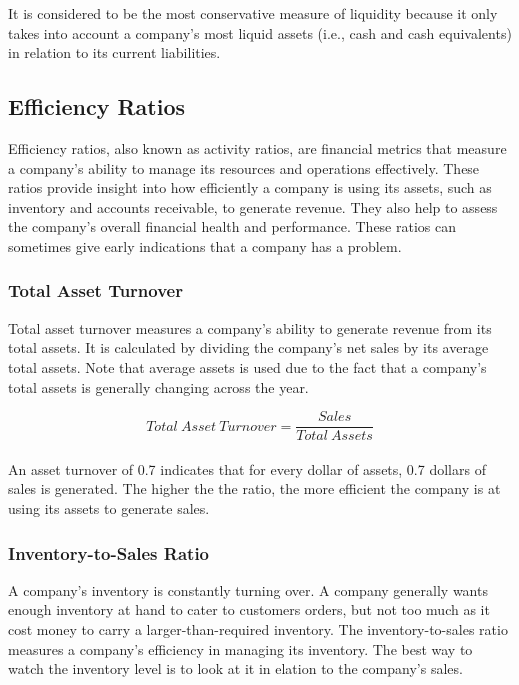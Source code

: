 \documentclass{article}
\begin{document}
It is considered to be the most conservative measure of liquidity because it only takes into account a company's most liquid assets (i.e., cash and cash equivalents) in relation to its current liabilities.

\subsection{Efficiency Ratios}
Efficiency ratios, also known as activity ratios, are financial metrics that measure a company's ability to manage its resources and operations effectively. These ratios provide insight into how efficiently a company is using its assets, such as inventory and accounts receivable, to generate revenue. They also help to assess the company's overall financial health and performance. These ratios can sometimes give early indications that a company has a problem.

\subsubsection{Total Asset Turnover}
Total asset turnover measures a company's ability to generate revenue from its total assets. It is calculated by dividing the company's net sales by its average total assets. Note that average assets is used due to the fact that a company's total assets is generally changing across the year. 

 \begin{equation}
    Total\: Asset\:Turnover = \frac{Sales}{Total\: Assets} 
\end{equation}\\

An asset turnover of 0.7 indicates that for every dollar of assets, 0.7 dollars of sales is generated. The higher the the ratio, the more efficient the company is at using its assets to generate sales. 

\subsubsection{Inventory-to-Sales Ratio}
A company's inventory is constantly turning over. A company generally wants enough inventory at hand to cater to customers orders, but not too much as it cost money to carry a larger-than-required inventory. The inventory-to-sales ratio measures a company's efficiency in managing its inventory. The best way to watch the inventory level is to look at it in elation to the company's sales. 
\end{document}
